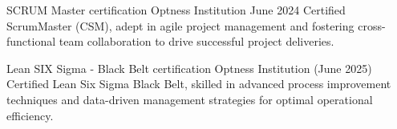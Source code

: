 
\begin{cventries}
  \cventry
  {SCRUM Master certification} %
  {Optness Institution} %
  {}
  {} %
  {June 2024} %
  {
    Certified ScrumMaster (CSM), adept in agile project management and fostering cross-functional team collaboration to drive successful project deliveries.
  }

  \cventry
  {Lean SIX Sigma - Black Belt certification} %
  {Optness Institution} %
  {}
  {} %
  {(June 2025)} %
  {
    Certified Lean Six Sigma Black Belt, skilled in advanced process improvement techniques and data-driven management strategies for optimal operational efficiency.
  }

\end{cventries}
